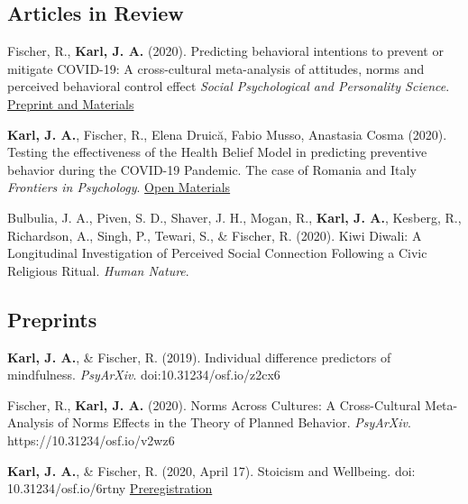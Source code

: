 \documentclass[11pt]{article} %
\begin{document}
\subsection*{Articles in Review}

\begin{hangparas}{2em}{1}

Fischer, R., \textbf{Karl, J. A.} (2020). Predicting behavioral intentions to prevent or mitigate COVID-19: A cross-cultural meta-analysis of attitudes, norms and perceived behavioral control effect \emph{Social Psychological and Personality Science}. \href{https://osf.io/tsxr2/}{Preprint and Materials}

\textbf{Karl, J. A.}, Fischer, R., Elena Druică, Fabio Musso, Anastasia Cosma (2020). Testing the effectiveness of the Health Belief Model in predicting preventive behavior during the COVID-19 Pandemic. The case of Romania and Italy \emph{Frontiers in Psychology}. \href{https://osf.io/k93dr/}{Open Materials}

Bulbulia, J. A., Piven, S. D., Shaver, J. H., Mogan, R., \textbf{Karl, J. A.}, Kesberg, R., Richardson, A., Singh, P., Tewari, S., \& Fischer, R. (2020). Kiwi Diwali: A Longitudinal Investigation of Perceived Social Connection Following a Civic Religious Ritual. \emph{Human Nature}.



\end{hangparas}

\subsection*{Preprints}

\begin{hangparas}{2em}{1}

\textbf{Karl, J. A.}, \& Fischer, R. (2019). Individual difference predictors of mindfulness. \emph{PsyArXiv}.
doi:10.31234/osf.io/z2cx6

Fischer, R., \textbf{Karl, J. A.} (2020). Norms Across Cultures: A Cross-Cultural Meta-Analysis of Norms Effects in the Theory of Planned Behavior. \emph{PsyArXiv}. https://10.31234/osf.io/v2wz6

\textbf{Karl, J. A.}, & Fischer, R. (2020, April 17). Stoicism and Wellbeing. doi: 10.31234/osf.io/6rtny \href{https://osf.io/bkqgs/?view_only=0bdc04bf606b41b9a1ac4ba0c7658990}{Preregistration} 

\end{hangparas}
\end{document}
